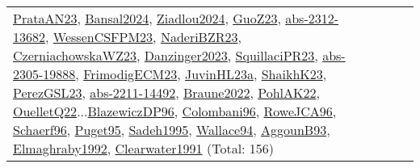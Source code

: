 {\begin{longtable}{p{3cm}r>{\raggedright\arraybackslash}p{6cm}>{\raggedright\arraybackslash}p{6cm}>{\raggedright\arraybackslash}p{8cm}}
\hyperref[detail:PrataAN23]{PrataAN23}, \hyperref[detail:Bansal2024]{Bansal2024}, \hyperref[detail:Ziadlou2024]{Ziadlou2024}, \hyperref[detail:GuoZ23]{GuoZ23}, \hyperref[detail:abs-2312-13682]{abs-2312-13682}, \hyperref[detail:WessenCSFPM23]{WessenCSFPM23}, \hyperref[detail:NaderiBZR23]{NaderiBZR23}, \hyperref[detail:CzerniachowskaWZ23]{CzerniachowskaWZ23}, \hyperref[detail:Danzinger2023]{Danzinger2023}, \hyperref[detail:SquillaciPR23]{SquillaciPR23}, \hyperref[detail:abs-2305-19888]{abs-2305-19888}, \hyperref[detail:FrimodigECM23]{FrimodigECM23}, \hyperref[detail:JuvinHL23a]{JuvinHL23a}, \hyperref[detail:ShaikhK23]{ShaikhK23}, \hyperref[detail:PerezGSL23]{PerezGSL23}, \hyperref[detail:abs-2211-14492]{abs-2211-14492}, \hyperref[detail:Braune2022]{Braune2022}, \hyperref[detail:PohlAK22]{PohlAK22}, \hyperref[detail:OuelletQ22]{OuelletQ22}...\hyperref[detail:BlazewiczDP96]{BlazewiczDP96}, \hyperref[detail:Colombani96]{Colombani96}, \hyperref[detail:RoweJCA96]{RoweJCA96}, \hyperref[detail:Schaerf96]{Schaerf96}, \hyperref[detail:Puget95]{Puget95}, \hyperref[detail:Sadeh1995]{Sadeh1995}, \hyperref[detail:Wallace94]{Wallace94}, \hyperref[detail:AggounB93]{AggounB93}, \hyperref[detail:Elmaghraby1992]{Elmaghraby1992}, \hyperref[detail:Clearwater1991]{Clearwater1991} (Total: 156)\\

\end{longtable}}
